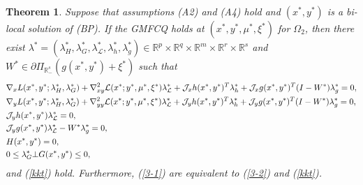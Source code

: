 \documentclass[11pt]{article}
\newtheorem{theorem}{Theorem}[section]
\theoremstyle{definition}
\theoremstyle{remark}
\numberwithin{equation}{section}
\begin{document}
\begin{theorem}\label{theorem dual First-order NOC for FP}
 Suppose that assumptions \textnormal{(A2)} and \textnormal{(A4)} hold and  $(x^*,y^*)$ is a bi-local solution of (BP).  If the GMFCQ holds at $(x^*,y^*,\mu^*,\xi^*)$ for $\Omega_2$, then there exist
      $\lambda^*=(\lambda_H^*,\lambda_G^*,\lambda_{\mathcal{L}}^*,\lambda_h^*,\lambda_g^*)
  \in\mathbb{R}^{p}\times\mathbb{R}^{q}\times\mathbb{R}^{m}
  \times\mathbb{R}^{r}\times\mathbb{R}^{s}$ and $ W^*\in \partial\Pi_{\mathbb{R}_{-}^s}(g(x^*,y^*)+\xi^*)$ such
  that
   \begin{align}\label{3-2}
&\nabla_{x}L(x^*,y^*;\lambda_H^*,\lambda_G^*)+\nabla_{xy}^2 \mathcal{L}(x^*;y^*,\mu^*,\xi^*)
\lambda_{\mathcal{L}}^* +\mathcal{J}_x h(x^*,y^*)^T\lambda_h^*+ \mathcal{J}_x
g(x^*,y^*)^T(I-W^*)\lambda_g^*=0,\notag\\
&  \nabla_{y}L(x^*,y^*;\lambda_H^*,\lambda_G^*)+\nabla_{yy}^2 \mathcal{L}(x^*;y^*,\mu^*,\xi^*)
\lambda_{\mathcal{L}}^* +\mathcal{J}_y h(x^*,y^*)^T\lambda_h^*+ \mathcal{J}_y
g(x^*,y^*)^T(I-W^*)\lambda_g^*=0,\notag\\
   & \mathcal{J}_y h(x^*,y^*)\lambda_{\mathcal{L}}^*=0,\notag \\
  &\mathcal{J}_y g(x^*,y^*)\lambda_{\mathcal{L}}^*-W^*\lambda_g^*=0,\notag\\
  &H(x^*,y^*)=0,\\
  &0\le \lambda_G^*\bot G(x^*,y^*)\le 0,\notag
\end{align}
and  (\ref{kkt}) hold. Furthermore, (\ref{3-1}) are equivalent to (\ref{3-2}) and  (\ref{kkt}).
\end{theorem}
\end{document}
